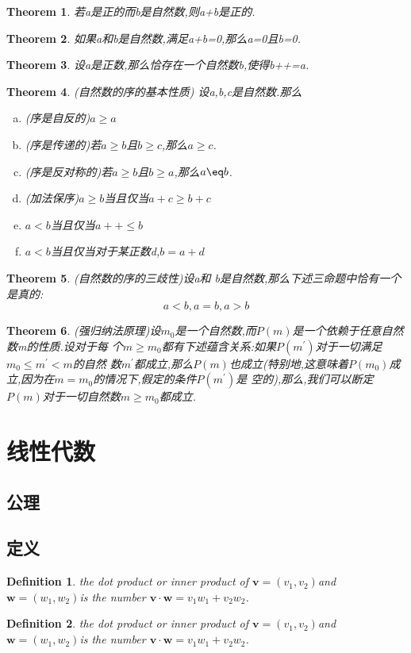 \documentclass[UTF-8]{ctexart}
\newtheorem{definition}{Definition}[section]
\newtheorem{theorem}{Theorem}[section]
\begin{document}
\begin{theorem}
若a是正的而b是自然数,则a+b是正的.
\end{theorem}

\begin{theorem}
如果a和b是自然数,满足a+b=0,那么a=0且b=0.
\end{theorem}

\begin{theorem}
设a是正数,那么恰存在一个自然数b,使得b++=a.
\end{theorem}

\begin{theorem}
  (自然数的序的基本性质) 设a,b,c是自然数.那么
\begin{enumerate}[(a)]
\item (序是自反的)$a\geq a$
\item (序是传递的)若$a \geq b$且$b \geq c$,那么$a \geq c$.
\item (序是反对称的)若$a \geq b$且$b \geq a$,那么$a \eq b$.
\item (加法保序)$a \geq b$当且仅当$a+c \geq b+c$
\item $a < b $当且仅当$a++ \leq b$
\item $a < b $当且仅当对于某正数d,$b=a+d$
\end{enumerate}
\end{theorem}

\begin{theorem}
  (自然数的序的三歧性)设a和
  b是自然数,那么下述三命题中恰有一个是真的:
  $$a<b,a=b,a>b$$
\end{theorem}

\begin{theorem}
(强归纳法原理)设$m_0$是一个自然数,而$P(m)$是一个依赖于任意自然数m的性质.设对于每
个$m \geq m_0$都有下述蕴含关系:如果$P(m^')$对于一切满足$m_0 \leq m^{'}  < m$的自然
数$m^'$都成立,那么$P(m
)$也成立(特别地,这意味着$P(m_0)$成立,因为在$m=m_0$的情况下,假定的条件$P(m^')$是
空的),那么,我们可以断定$P(m)$对于一切自然数$m \geq m_0$都成立.
\end{theorem}

\newpage
\section{线性代数}

\subsection{公理}
\subsection{定义}
\begin{definition}
  the dot product or inner product of $\mathbf{v}
=(v_1,v_2)$and$\mathbf{w}=(w_1,w_2)$is the number $\mathbf{v} \cdot \mathbf{w} = v_1w_1+v_2w_2$.

\end{definition}
\begin{definition}
  the dot product or inner product of $\mathbf{v}
=(v_1,v_2)$and$\mathbf{w}=(w_1,w_2)$is the number $\mathbf{v} \cdot \mathbf{w} = v_1w_1+v_2w_2$.

\end{definition}
\end{document}
